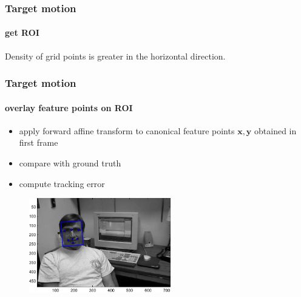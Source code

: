 \begin{frame}[plain]
\frametitle{Target motion}
\framesubtitle{get ROI}
\logoCSIPCPL\mypagenum
\begin{changemargin}{-1.3in}{0in}
Density of grid points is greater in the horizontal direction.
\begin{figure}[t]
\centering
{}
\end{figure}
\end{changemargin}
\end{frame}


\begin{frame}
\frametitle{Target motion}
\framesubtitle{overlay feature points on ROI}
\logoCSIPCPL\mypagenum
\begin{itemize}
\item apply forward affine transform to canonical feature points $\mathbf{x,y}$ obtained in first frame
\item compare with ground truth
\item compute tracking error
\end{itemize}
\begin{figure}[t]
\centering
\includegraphics[width=0.55\textwidth]{thesis/dataset_Dudek_with_feature_points_00001.pdf}
\label{Fig:overall}
\end{figure}
\end{frame}

